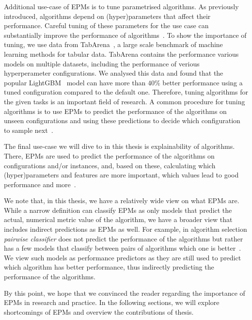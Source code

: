 Additional use-case of EPMs is to tune parametrised algorithms. As previously introduced, algorithms depend on (hyper)parameters that affect their performance. Careful tuning of these parameters for the use case can substantially improve the performance of algorithms~\citep{HutEtAl06,HutEtAl11}. To show the importance of tuning, we use data from TabArena~\citep{EriEtAl25}, a large scale benchmark of machine learning methods for tabular data. TabArena contains the performance various models on multiple datasets, including the performance of verious hyperperameter configurations. We analysed this data and found that the popular LightGBM~\citep{KeEtAl17} model can have more than $40\%$ better performance using a tuned configuration compared to the default one. Therefore, tuning algorithms for the given tasks is an important field of research. A common procedure for tuning algorithms is to use EPMs to predict the performance of the algorithms on unseen configurations and using these predictions to decide which configuration to sample next~\citep{HutEtAl11,SnoEtAl12}.

The final use-case we will dive to in this thesis is explainability of algorithms. There, EPMs are used to predict the performance of the algorithms on configurations and/or instances, and, based on these, calculating which (hyper)parameters and features are more important, which values lead to good performance and more~\citep{HutEtAl14b,MooEtAl21}.

We note that, in this thesis, we have a relatively wide view on what EPMs are. While a narrow definition can classify EPMs as only models that predict the actual, numerical metric value of the algorithm, we have a broader view that includes indirect predictions as EPMs as well. For example, in algorithm selection \textit{pairwise classifier} does not predict the performance of the algorithms but rather has a few models that classify between pairs of algorithms which one is better~\citep{XuEtAl12b}. We view such models as performance predictors as they are still used to predict which algorithm has better performance, thus indirectly predicting the performance of the algorithms.

By this point, we hope that we convinced the reader regarding the importance of EPMs in research and practice. In the following sections, we will explore shortcomings of EPMs and overview the contributions of thesis.



